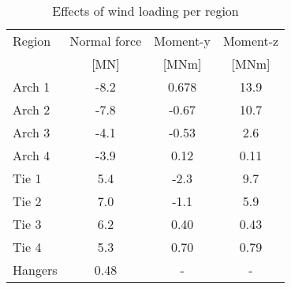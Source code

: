 \begin{table}[H] 
\caption{Effects of wind loading per region}
\centering
\begin{tabular}{lccc}
\hline
Region & Normal force & Moment-y & Moment-z \\
 & [MN]   & [MNm] & [MNm] \\ \hline
Arch 1 & -8.2 & 0.678 & 13.9\\
Arch 2 & -7.8 & -0.67 & 10.7\\
Arch 3 & -4.1 & -0.53 & 2.6\\
Arch 4 & -3.9 & 0.12 & 0.11\\
Tie 1 & 5.4 & -2.3 & 9.7\\
Tie 2 & 7.0 & -1.1 & 5.9\\
Tie 3 & 6.2 & 0.40 & 0.43\\
Tie 4 & 5.3 & 0.70 & 0.79\\
Hangers & 0.48 & - & - \\ \hline
\end{tabular}
\end{table}
